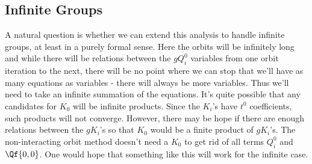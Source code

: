 \subsection{Infinite Groups}

A natural question is whether we can extend this analysis to handle infinite groups, at least in a purely formal sense. Here the orbits will be infinitely long and while there will be relations between the $g Q_i^0$ variables from one orbit iteration to the next, there will be no point where we can stop that we'll have as many equations as variables - there will always be more variables. Thus we'll need to take an infinite summation of the equations. It's quite possible that any candidates for $K_0$ will be infinite products. Since the $K_i$'s have $t^0$ coefficients, such products will not converge. However, there may be hope if there are enough relations between the $g K_i$'s so that $K_0$ would be a finite product of $g K_i$'s. The non-interacting orbit method doesn't need a $K_0$ to get rid of all terms $Q_i^0$ and $\Qf{0,0}$. One would hope that something like this will work for the infinite case.

\endinput



It's worth mentioning that it doesn't seem that all Coxeter groups are manifested in random walk models. Looking at the classification of finite Coxeter groups, those of rank 2 have orders 4, 6, 8, 12, 10 and 2$p$ (manifested in a $p$-gon). Namely the groups of orders 10,12 and 2$p$ (for most $p$) are not manifested in random walk models with small steps on the quarter plane. It appears that the $p$-gon symmetries are not present for most $p$ because of the crystallographic nature of the problem. It's quite possible that the Crystallographic restriction theorem will apply to the random walk model groups in all dimensions. However, as can be seen, a lot of random walk model groups in 2 dimensions have generators that don't map the lattice back onto itself in a simple way because the transformations are bi-rational. We can define classes of groups.

